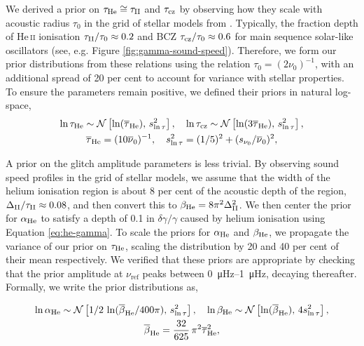 
We derived a prior on \(\tau_{{\mathrm{He}}} \cong \tau_{{\mathrm{II}}}\) and \(\tau_{{\mathrm{cz}}}\) by observing how they scale with acoustic radius \(\tau_0\) in the grid of stellar models from \citep{Lyttle.Davies.ea2021}. Typically, the fraction depth of He\,\textsc{ii} ionisation \(\tau_{{\mathrm{II}}}/\tau_0 \approx 0.2\) and BCZ \(\tau_{{\mathrm{cz}}}/\tau_0 \approx 0.6\) for main sequence solar-like oscillators (see, e.g. Figure \ref{fig:gamma-sound-speed}). Therefore, we form our prior distributions from these relations using the relation \({\tau}_0 = (2\nu_0)^{-1}\), with an additional spread of 20 per cent to account for variance with stellar properties. To ensure the parameters remain positive, we defined their priors in natural log-space,
%
\begin{gather*}
    \ln\tau_{{\mathrm{He}}} \sim \mathcal{N}\left[ \ln(\overline{\tau}_{{\mathrm{He}}}), \, s_{\ln\tau}^2 \right], \quad \ln\tau_{{\mathrm{cz}}} \sim \mathcal{N}\left[\ln(3\overline{\tau}_{{\mathrm{He}}}), \, s_{\ln\tau}^2 \right],\\
    \overline{\tau}_{{\mathrm{He}}} = (10 \overline{\nu}_0)^{-1}, \quad s_{\ln\tau}^2 = (1/5)^2 + (s_{\nu_0}/\overline{\nu}_0)^2,
\end{gather*}

A prior on the glitch amplitude parameters is less trivial. By observing sound speed profiles in the grid of stellar models, we assume that the width of the helium ionisation region is about 8 per cent of the acoustic depth of the region, \(\Delta_{{\mathrm{II}}}/\tau_{{\mathrm{II}}} \approx 0.08\), and then convert this to \(\beta_{{\mathrm{He}}} = 8\pi^2\Delta_{{\mathrm{II}}}^2\). We then center the prior for \(\alpha_{{\mathrm{He}}}\) to satisfy a depth of 0.1 in \(\delta\gamma/\gamma\) caused by helium ionisation using Equation \ref{eq:he-gamma}. To scale the priors for \(\alpha_{{\mathrm{He}}}\) and \(\beta_{{\mathrm{He}}}\), we propagate the variance of our prior on \(\tau_{{\mathrm{He}}}\), scaling the distribution by 20 and 40 per cent of their mean respectively. We verified that these priors are appropriate by checking that the prior amplitude at \(\nu_\mathrm{ref}\) peaks between \SIrange{0}{1}{\micro\hertz}, decaying thereafter. Formally, we write the prior distributions as,

\begin{gather*}
    \ln\alpha_{{\mathrm{He}}} \sim \mathcal{N}\left[ 1/2 \, \ln({\overline{\beta}_{{\mathrm{He}}}}/{400\pi}), \, s_{\ln\tau}^2 \right], \quad \ln\beta_{{\mathrm{He}}} \sim \mathcal{N}\left[ \ln(\overline{\beta}_{{\mathrm{He}}}), \, 4 s_{\ln\tau}^2 \right],\\
    \overline{\beta}_{{\mathrm{He}}} = \frac{32}{625} \, \pi^2 \overline{\tau}_{{\mathrm{He}}}^2,
\end{gather*}

